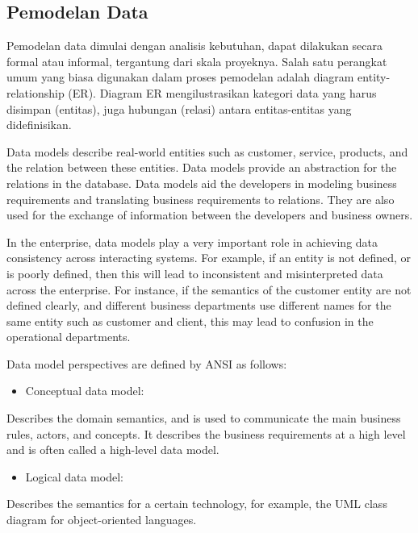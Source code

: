 \documentclass[]{book}
\providecommand{\tightlist}{%
  \setlength{\itemsep}{0pt}\setlength{\parskip}{0pt}}
\begin{document}
\hypertarget{pemodelan-data}{%
\subsection{Pemodelan Data}\label{pemodelan-data}}

Pemodelan data dimulai dengan analisis kebutuhan, dapat dilakukan secara formal atau informal, tergantung dari skala proyeknya. Salah satu perangkat umum yang biasa digunakan dalam proses pemodelan adalah diagram entity-relationship (ER). Diagram ER mengilustrasikan kategori data yang harus disimpan (entitas), juga hubungan (relasi) antara entitas-entitas yang didefinisikan.

Data models describe real-world entities such as customer, service, products, and the relation between these entities. Data models provide an abstraction for the relations in the database. Data models aid the developers in modeling business requirements and translating business requirements to relations. They are also used for the exchange of information between the developers and business owners.

In the enterprise, data models play a very important role in achieving data consistency across interacting systems. For example, if an entity is not defined, or is poorly defined, then this will lead to inconsistent and misinterpreted data across the enterprise. For instance, if the semantics of the customer entity are not defined clearly, and different business departments use different names for the same entity such as customer and client, this may lead to confusion in the operational departments.

Data model perspectives are defined by ANSI as follows:

\begin{itemize}
\tightlist
\item
  Conceptual data model:
\end{itemize}

Describes the domain semantics, and is used to communicate the main business rules, actors, and concepts. It describes the business requirements at a high level and is often called a high-level data model.

\begin{itemize}
\tightlist
\item
  Logical data model:
\end{itemize}

Describes the semantics for a certain technology, for example, the UML class diagram for object-oriented languages.
\end{document}
